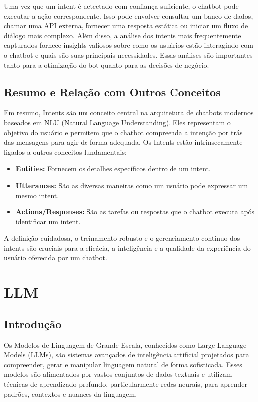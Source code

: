 \documentclass[14pt,a4paper,oneside]{book}
\begin{document}
Uma vez que um intent é detectado com confiança suficiente, o chatbot pode executar a ação correspondente. Isso pode envolver consultar um banco de dados, chamar uma API externa, fornecer uma resposta estática ou iniciar um fluxo de diálogo mais complexo. Além disso, a análise dos intents mais frequentemente capturados fornece insights valiosos sobre como os usuários estão interagindo com o chatbot e quais são suas principais necessidades. Essas análises são importantes tanto para a otimização do bot quanto para as decisões de negócio.

\section{Resumo e Relação com Outros Conceitos}
\label{sec:intents_resumo}

Em resumo, Intents são um conceito central na arquitetura de chatbots modernos baseados em NLU (Natural Language Understanding). Eles representam o objetivo do usuário e permitem que o chatbot compreenda a intenção por trás das mensagens para agir de forma adequada. Os Intents estão intrinsecamente ligados a outros conceitos fundamentais:
\begin{itemize}
    \item \textbf{Entities:} Fornecem os detalhes específicos dentro de um intent.
    \item \textbf{Utterances:} São as diversas maneiras como um usuário pode expressar um mesmo intent.
    \item \textbf{Actions/Responses:} São as tarefas ou respostas que o chatbot executa após identificar um intent.
\end{itemize}
A definição cuidadosa, o treinamento robusto e o gerenciamento contínuo dos intents são cruciais para a eficácia, a inteligência e a qualidade da experiência do usuário oferecida por um chatbot.


\chapter{LLM}

\section{Introdução}

Os Modelos de Linguagem de Grande Escala, conhecidos como Large Language Models (LLMs), são sistemas avançados de inteligência artificial projetados para compreender, gerar e manipular linguagem natural de forma sofisticada. Esses modelos são alimentados por vastos conjuntos de dados textuais e utilizam técnicas de aprendizado profundo, particularmente redes neurais, para aprender padrões, contextos e nuances da linguagem.
\end{document}
